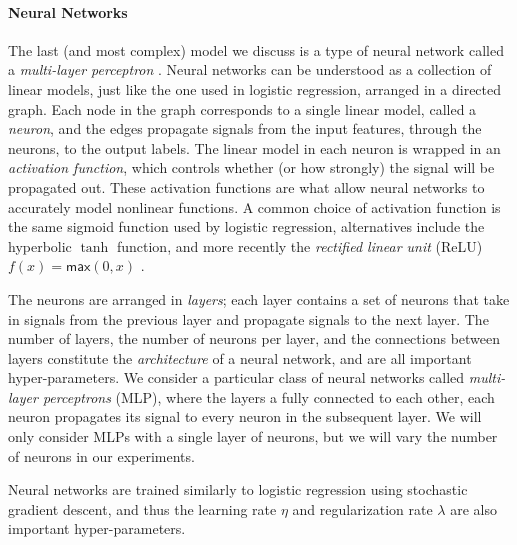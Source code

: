 \paragraph{Neural Networks}
The last (and most complex) model we discuss is a type of neural network
called a \emph{multi-layer perceptron} .
%
Neural networks can be understood as a collection of linear models, just
like the one used in logistic regression, arranged in a directed graph.
%
Each node in the graph corresponds to a single linear model, called a
\emph{neuron}, and the edges propagate signals from the input features,
through the neurons, to the output labels.
%
The linear model in each neuron is wrapped in an \emph{activation
  function}, which controls whether (or how strongly) the signal will be
propagated out.
%
These activation functions are what allow neural networks to accurately
model nonlinear functions.
%
A common choice of activation function is the same sigmoid function
used by logistic regression, alternatives include the hyperbolic $\tanh$
function, and more recently the \emph{rectified linear unit} (ReLU)
$f(x) = \mathsf{max}(0,x)$ .

The neurons are arranged in \emph{layers}; each layer contains a set of
neurons that take in signals from the previous layer and propagate
signals to the next layer.
%
The number of layers, the number of neurons per layer, and the
connections between layers constitute the \emph{architecture} of a
neural network, and are all important hyper-parameters.
%
We consider a particular class of neural networks called
\emph{multi-layer perceptrons} (MLP), where the layers a fully connected to
each other, \ie each neuron propagates its signal to every neuron in the
subsequent layer.
%
We will only consider MLPs with a single layer of neurons, but we will
vary the number of neurons in our experiments.

Neural networks are trained similarly to logistic regression using
stochastic gradient descent, and thus the learning rate $\eta$ and
regularization rate $\lambda$ are also important hyper-parameters.






\lstMakeShortInline{|}

